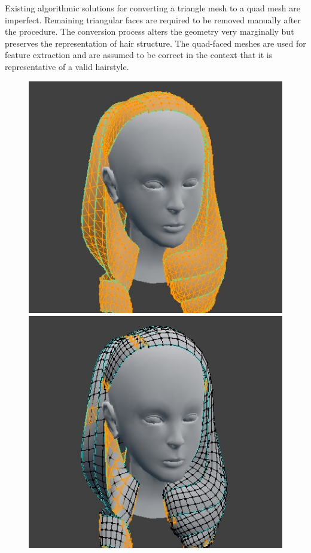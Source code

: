 \documentclass[ %
author={Dillon Keith Diep},
supervisor={Dr. Carl Henrik Ek},
degree={MEng},
title={ART-CG Hair:},
subtitle={Assisted Real-time Content Generation of Stylised Virtual Hair},
type={Research},
year={2017} ]{dissertation}
\begin{document}
Existing algorithmic solutions for converting a triangle mesh to a quad mesh are imperfect. Remaining triangular faces are required to be removed manually after the procedure. The conversion process alters the geometry very marginally but preserves the representation of hair structure. The quad-faced meshes are used for feature extraction and are assumed to be correct in the context that it is representative of a valid hairstyle. 

\begin{figure}[!h]
	\centering
	\includegraphics[scale=2]{images/triToQuad1}
	\includegraphics[scale=2]{images/triToQuad2}

\end{figure}
\end{document}
